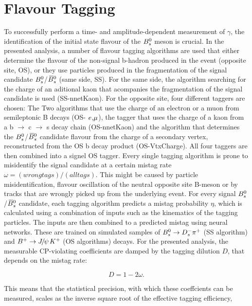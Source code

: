 \section{Flavour Tagging}
\label{sec:Tagging}
To successfully perform a time- and amplitude-dependent measurement of $\gamma$, the identification of the initial state flavour of the ${{B}^0_{s}}$ meson is crucial.
In the presented analysis, a number of flavour tagging algorithms are used that either determine the flavour of the non-signal b-hadron produced in the event (opposite site, OS), 
or they use particles produced in the fragmentation of the signal candidate ${{B}^0_{s}}$/${{\kern 0.18em\overline{\kern -0.18em B}{}}{}^0_{s}}$ (same side, SS). \newline
For the same side, the algorithm searching for the charge of an aditional kaon that acompanies the fragmentation of the signal candidate is used (SS-nnetKaon). For the opposite site, four different taggers are chosen: 
The Two algorithms that use the charge of an electron or a muon from semileptonic B decays (OS- ${e}$,${\mu}$), the tagger that uses the charge of a kaon from a b $\to$ c $\to$ s decay chain (OS-nnetKaon) 
and the algorithm that determines the ${{B}^0_{s}}$/${{\kern 0.18em\overline{\kern -0.18em B}{}}{}^0_{s}}$ candidate flavour from the charge of a secondary vertex, reconstructed from the OS b decay product (OS-VtxCharge). 
All four taggers are then combined into a signel OS tagger. \newline
Every single tagging algorithm is prone to misidentify the signal candidate at a certain mistag rate $\omega = (wrong tags)/ (all tags)$. 
This might be caused by particle misidentification, flavour oscillation of the neutral opposite site B-meson or by tracks that are wrongly picked up from the underlying event. 
For every signal ${{B}^0_{s}}$/${{\kern 0.18em\overline{\kern -0.18em B}{}}{}^0_{s}}$ candidate, each tagging algorithm predicts a mistag probability $\eta$, which is calculated using a combination of inputs such as the kinematics of the tagging particles. 
The inputs are then combined to a predicted mistag using neural networks. These are trained on simulated samples of ${{B}^0_{s}}\rightarrow{\ensuremath{{D}^-_{s}}}{\ensuremath{{\pi}^+}}$ (SS algorithm) and ${{B}^+}\rightarrow{\ensuremath{{J\mskip -3mu/\mskip -2mu\psi\mskip 2mu}}}{\ensuremath{{K}^+}}$ (OS algorithms) decays.
For the presented analysis, the measurable CP-violating coefficients are damped by the tagging dilution $D$, that depends on the mistag rate:

\begin{equation}
\label{eq: taggingDilution}
D = 1 - 2\omega.
\end{equation}

This means that the statistical precision, with which these coeffcients can be measured, scales as the inverse square root of the effective tagging efficiency,

